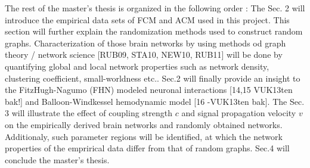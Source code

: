 The rest of the master's thesis is organized in the following order : The Sec. 2 will introduce the empirical data sets of FCM and ACM used in this project. This section will further explain the randomization methods used to construct random graphs. Characterization of those brain networks by using methods od graph theory / network science [RUB09, STA10, NEW10, RUB11] will be done by quantifying global and local network properties such as network density, clustering coefficient, small-worldness etc.. Sec.2 will finally provide an insight to the FitzHugh-Nagumo (FHN) modeled neuronal interactions [14,15 VUK13ten bak!] and Balloon-Windkessel hemodynamic model [16 -VUK13ten bak]. The Sec. 3 will illustrate the effect of coupling strength $c$ and signal propagation velocity $v$ on the empirically derived brain networks and randomly obtained networks. Additionaly, such parameter regions will be identified, at which the network properties of the emprirical data differ from that of random graphs. Sec.4 will conclude the master's thesis. 

 
 

